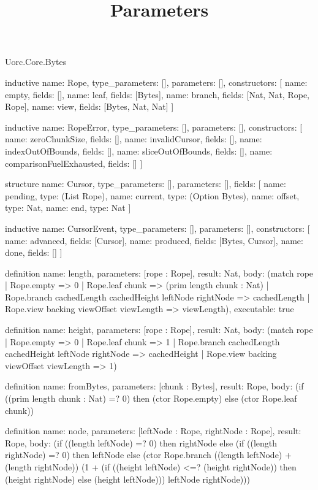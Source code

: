 \begin{lexlean}{Uorc.Core.Bytes}
\title{Parameters}
\begin{semanticmodule}
inductive{
  name: Rope,
  type_parameters: [],
  parameters: [],
  constructors: [
    {name: empty, fields: []},
    {name: leaf, fields: [Bytes]},
    {name: branch, fields: [Nat, Nat, Rope, Rope]},
    {name: view, fields: [Bytes, Nat, Nat]}
  ]
}

inductive{
  name: RopeError,
  type_parameters: [],
  parameters: [],
  constructors: [
    {name: zeroChunkSize, fields: []},
    {name: invalidCursor, fields: []},
    {name: indexOutOfBounds, fields: []},
    {name: sliceOutOfBounds, fields: []},
    {name: comparisonFuelExhausted, fields: []}
  ]
}

structure{
  name: Cursor,
  type_parameters: [],
  parameters: [],
  fields: [
    {name: pending, type: (List Rope)},
    {name: current, type: (Option Bytes)},
    {name: offset, type: Nat},
    {name: end, type: Nat}
  ]
}

inductive{
  name: CursorEvent,
  type_parameters: [],
  parameters: [],
  constructors: [
    {name: advanced, fields: [Cursor]},
    {name: produced, fields: [Bytes, Cursor]},
    {name: done, fields: []}
  ]
}

definition{
  name: length,
  parameters: [rope : Rope],
  result: Nat,
  body: (match rope
    | Rope.empty => 0
    | Rope.leaf chunk => (prim length chunk : Nat)
    | Rope.branch cachedLength cachedHeight leftNode rightNode => cachedLength
    | Rope.view backing viewOffset viewLength => viewLength),
  executable: true
}

definition{
  name: height,
  parameters: [rope : Rope],
  result: Nat,
  body: (match rope
    | Rope.empty => 0
    | Rope.leaf chunk => 1
    | Rope.branch cachedLength cachedHeight leftNode rightNode => cachedHeight
    | Rope.view backing viewOffset viewLength => 1)
}

definition{
  name: fromBytes,
  parameters: [chunk : Bytes],
  result: Rope,
  body: (if ((prim length chunk : Nat) =? 0) then (ctor Rope.empty) else (ctor Rope.leaf chunk))
}

definition{
  name: node,
  parameters: [leftNode : Rope, rightNode : Rope],
  result: Rope,
  body: (if ((length leftNode) =? 0) then rightNode else (if ((length rightNode) =? 0) then leftNode else (ctor Rope.branch ((length leftNode) + (length rightNode)) (1 + (if ((height leftNode) <=? (height rightNode)) then (height rightNode) else (height leftNode))) leftNode rightNode)))
}


\end{semanticmodule}
\end{lexlean}
